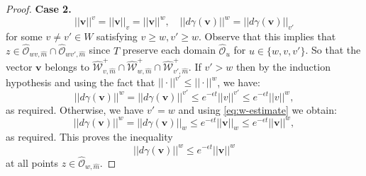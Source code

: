 \documentclass[12pt]{amsbook}%
\theoremstyle{definition}
\theoremstyle{remark}
\numberwithin{section}{chapter}
\numberwithin{subsection}{section}
\numberwithin{figure}{chapter}
\def\eps{\epsilon}
\def\cO{{\mathscr{O}}}
\def\cW{{\mathscr{W}}}
\def\ba{\mathbf{a}}
\def\bv{\mathbf{v}}
\def\ga{\gamma}
\begin{document}
{{\begin{proof}
\medskip 
{\bf Case 2.} 
$$
||\bv||^v= ||\bv||_v= ||\bv||^w, \quad ||d\ga(\bv)||^w= ||d\ga(\bv)||_{v'} 
$$
for some $ v \neq  v'\in W$ satisfying $v\ge w, v'\ge w$.
Observe that this implies that $z \in \hat{\cO}_{wv,\hat{m}}\cap \hat{\cO}_{wv',\hat{m}}$ since $T$ preserve each domain $\hat{\cO}_{u}$ for $u \in \{ w,v,v'\}$. 
So that the vector $\bv$ belongs to $\hat{\cW}_{v,\hat{m}}^+ \cap \hat{\cW}_{w,\hat{m}}^+ \cap \hat{\cW}_{v', \hat{m}}^+$. 
If $v' > w$ then by the induction hypothesis and using the fact that $|| \cdot ||^{v'}\leqslant || \cdot ||^{w}$, we have: 
\begin{equation*}
|| d \gamma(\bv)||^w = || d\gamma (\bv)||^{v'} \leqslant e^{-\epsilon t} || v||^{v'} \leqslant e^{-\epsilon t} || v||^{w},  
\end{equation*}
as required. 
Otherwise, we have $v'=w$ and using \eqref{eq:w-estimate} 
we obtain: 
\begin{equation*}
|| d \gamma(\bv)||^{w} = || d\gamma(\bv) ||_w \leqslant e^{-\epsilon t} || \bv ||_w \leqslant e^{-\epsilon t} || \bv||^w, 
\end{equation*}
as required.   
This proves the inequality 
$$
 ||d\ga (\bv)||^w\leqslant  e^{-\eps t} ||\bv||^w  
$$
at all points $z\in \hat{\cO}_{w,\hat{m}}$. 


\end{proof}}}
\end{document}

